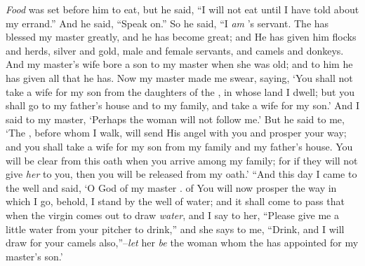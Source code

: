 
\bverse \textit{Food} was set before him to eat, but he said, ``I will not eat until I have told about my errand.'' And he said, ``Speak on.''
\bverse So he said, ``I \textit{am} \Abraham's servant.
\bverse The \lord has blessed my master greatly, and he has become great; and He has given him flocks and herds, silver and gold, male and female servants, and camels and donkeys.
\bverse And \Sarah my master's wife bore a son to my master when she was old; and to him he has given all that he has.
\bverse Now my master made me swear, saying, `You shall not take a wife for my son from the daughters of the , in whose land I dwell;
\bverse but you shall go to my father's house and to my family, and take a wife for my son.'
\bverse And I said to my master, `Perhaps the woman will not follow me.'
\bverse But he said to me, `The \lord, before whom I walk, will send His angel with you and prosper your way; and you shall take a wife for my son from my family and my father's house.
\bverse You will be clear from this oath when you arrive among my family; for if they will not give \textit{her} to you, then you will be released from my oath.'
\bverse ``And this day I came to the well and said, `O \lord God of my master \Abraham. of You will now prosper the way in which I go,
\bverse behold, I stand by the well of water; and it shall come to pass that when the virgin comes out to draw \textit{water}, and I say to her, ``Please give me a little water from your pitcher to drink,''
\bverse and she says to me, ``Drink, and I will draw for your camels also,''--\textit{let} her \textit{be} the woman whom the \lord has appointed for my master's son.'
